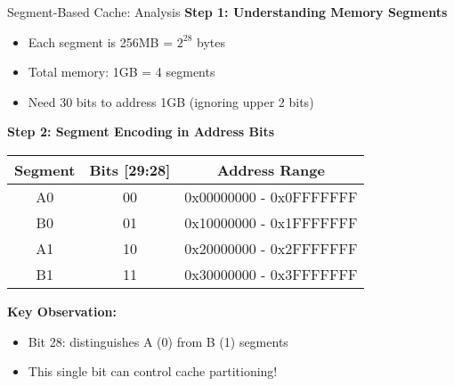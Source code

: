 \documentclass[aspectratio=169,12pt]{beamer}
\begin{document}
\begin{frame}{Segment-Based Cache: Analysis}
\textbf{Step 1: Understanding Memory Segments}
\begin{itemize}
    \item Each segment is 256MB = $2^{28}$ bytes
    \item Total memory: 1GB = 4 segments
    \item Need 30 bits to address 1GB (ignoring upper 2 bits)
\end{itemize}
\pause

\textbf{Step 2: Segment Encoding in Address Bits}
\begin{center}
\begin{tabular}{|c|c|c|}
\hline
\textbf{Segment} & \textbf{Bits [29:28]} & \textbf{Address Range} \\
\hline
A0 & 00 & 0x00000000 - 0x0FFFFFFF \\
B0 & 01 & 0x10000000 - 0x1FFFFFFF \\
A1 & 10 & 0x20000000 - 0x2FFFFFFF \\
B1 & 11 & 0x30000000 - 0x3FFFFFFF \\
\hline
\end{tabular}
\end{center}
\pause

\textbf{Key Observation:}
\begin{itemize}
    \item Bit 28: distinguishes A (0) from B (1) segments
    \item This single bit can control cache partitioning!
\end{itemize}
\end{frame}
\end{document}
